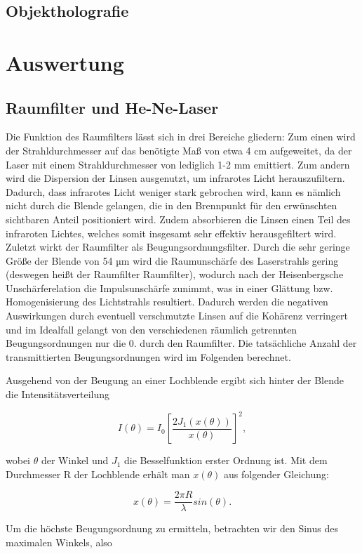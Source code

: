 \documentclass[bigchapter,colorback,accentcolor=tud4b,linedtoc,11pt]{tudreport}
\begin{document}
\section{Objektholografie}

\chapter{Auswertung}

\section{Raumfilter und He-Ne-Laser}

Die Funktion des Raumfilters lässt sich in drei Bereiche gliedern: Zum einen wird der Strahldurchmesser auf das benötigte Maß von etwa 4 cm aufgeweitet, da der Laser mit einem Strahldurchmesser von lediglich 1-2 mm emittiert. Zum andern wird die Dispersion der Linsen ausgenutzt, um infrarotes Licht herauszufiltern. Dadurch, dass infrarotes Licht weniger stark gebrochen wird, kann es nämlich nicht durch die Blende gelangen, die in den Brennpunkt für den erwünschten sichtbaren Anteil positioniert wird. Zudem absorbieren die Linsen einen Teil des infraroten Lichtes, welches somit insgesamt sehr effektiv herausgefiltert wird. Zuletzt wirkt der Raumfilter als Beugungsordnungsfilter. Durch die sehr geringe Größe der Blende von 54 µm wird die Raumunschärfe des Laserstrahls gering (deswegen heißt der Raumfilter Raumfilter), wodurch nach der Heisenbergsche Unschärferelation die Impulsunschärfe zunimmt, was in einer Glättung bzw. Homogenisierung des Lichtstrahls resultiert. Dadurch werden die negativen Auswirkungen durch eventuell verschmutzte Linsen auf die Kohärenz verringert und im Idealfall gelangt von den verschiedenen räumlich getrennten Beugungsordnungen nur die 0. durch den Raumfilter. Die tatsächliche Anzahl der transmittierten Beugungsordnungen wird im Folgenden berechnet.

Ausgehend von der Beugung an einer Lochblende ergibt sich hinter der Blende die Intensitätsverteilung

$$I(\theta) = I_0 \left[ \frac{2 J_1(x(\theta))}{x(\theta)} \right]^2,$$

wobei $\theta$ der Winkel und $J_1$ die Besselfunktion erster Ordnung ist. Mit dem Durchmesser R der Lochblende erhält man $x(\theta)$ aus folgender Gleichung: 

$$x(\theta) = \frac{2 \pi R}{\lambda} sin(\theta).$$

Um die höchste Beugungsordnung zu ermitteln, betrachten wir den Sinus des maximalen Winkels, also
\end{document}
